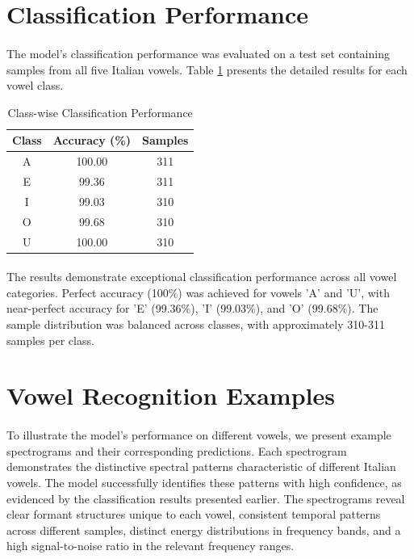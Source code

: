 \section{Classification Performance}
\label{sec:classification-performance}

\paragraph{}
The model's classification performance was evaluated on a test set containing samples from all five Italian vowels. Table \ref{tab:class_performance} presents the detailed results for each vowel class.

\begin{table}[h]
    \centering
    \begin{tabular}{|c|c|c|}
        \hline
        \textbf{Class} & \textbf{Accuracy (\%)} & \textbf{Samples} \\
        \hline
        A & 100.00 & 311 \\
        E & 99.36 & 311 \\
        I & 99.03 & 310 \\
        O & 99.68 & 310 \\
        U & 100.00 & 310 \\
        \hline
    \end{tabular}
    \caption{Class-wise Classification Performance}
    \label{tab:class_performance}
\end{table}

\paragraph{}
The results demonstrate exceptional classification performance across all vowel categories. Perfect accuracy (100\%) was achieved for vowels 'A' and 'U', with near-perfect accuracy for 'E' (99.36\%), 'I' (99.03\%), and 'O' (99.68\%). The sample distribution was balanced across classes, with approximately 310-311 samples per class.

\section{Vowel Recognition Examples}
\label{sec:recognition-examples}

\paragraph{}
To illustrate the model's performance on different vowels, we present example spectrograms and their corresponding predictions. Each spectrogram demonstrates the distinctive spectral patterns characteristic of different Italian vowels. The model successfully identifies these patterns with high confidence, as evidenced by the classification results presented earlier. The spectrograms reveal clear formant structures unique to each vowel, consistent temporal patterns across different samples, distinct energy distributions in frequency bands, and a high signal-to-noise ratio in the relevant frequency ranges.

